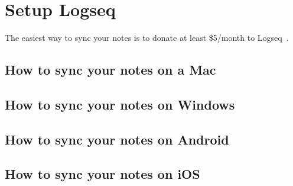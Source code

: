 \chapter{Setup Logseq}\label{ch:setup-logseq}

The easiest way to sync your notes is to donate at least \$5/month to Logseq~\cite{logseqHowSetupUse}.
%


\section{How to sync your notes on a Mac}\label{sec:how-to-sync-your-notes-on-a-mac}


\section{How to sync your notes on Windows}\label{subsec:how-to-sync-your-notes-on-windows}


\section{How to sync your notes on Android}\label{sec:how-to-sync-your-notes-on-android}


\section{How to sync your notes on iOS}\label{sec:how-to-sync-your-notes-on-ios}
